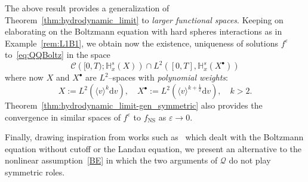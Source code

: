 \documentclass[AHL,Unicode,longabstracts,published]{cedram}
\newcommand{\ns}{\mathrm{NS}}
\renewcommand{\d}{\mathrm{d}}
\newcommand{\bbH}{\mathbb{H}}
\newcommand{\CC}{\mathcal{C}}
\newcommand{\QQ}{\mathcal{Q}}
\newcommand{\Sl}{X}
\newcommand{\Slp}{X^{\bullet}}
\newcommand*\eps{{\varepsilon}}
\newcommand{\la}{\langle}
\newcommand{\ra}{\rangle}
\begin{document}
\begin{exem}
The above result provides a generalization of Theorem~\ref{thm:hydrodynamic_limit} to \emph{larger functional spaces}. Keeping on elaborating on the Boltzmann equation with hard spheres interactions as in Example~\ref{rem:L1B1}, we obtain now the existence, uniqueness of solutions $f^{\eps}$ to~\eqref{eq:QQBoltz} in the space
\[
\CC\left([0, T) ; \bbH^s_x \left(\Sl \right) \right) \cap L^{2}\left([0,T],\bbH^{s}_{x}(\Slp)\right)
\]
where now $\Sl$ and $\Slp$ are $L^{2}$--spaces with \emph{polynomial weights}:
\[
\Sl := L^2\left(\la v \ra^k \d v \right), \quad \Slp := L^2\left(\la v \ra^{k+\frac{1}{2}}\d v\right), \quad k > 2.
\]
Theorem~\ref{thm:hydrodynamic_limit-gen_symmetric} also provides the convergence in similar spaces of $f^{\eps}$ to $f_\ns$ as $\eps \to 0.$
\end{exem}

Finally, drawing inspiration from works such as~\cite{CG2022,CM2017,CTW2016, HTT2020} which dealt with the Boltzmann equation without cutoff or the Landau equation, we present an alternative to the nonlinear assumption~\eqref{BE} in which the two arguments of $\QQ$ do not play symmetric roles.
\end{document}
